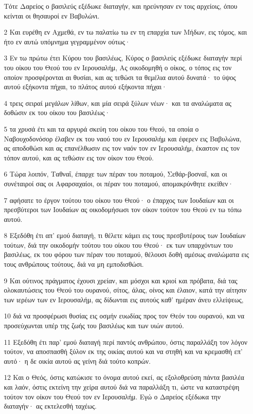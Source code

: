 \par Τότε Δαρείος ο βασιλεύς εξέδωκε διαταγήν, και ηρεύνησαν εν τοις αρχείοις, όπου κείνται οι θησαυροί εν Βαβυλώνι.
\par 2 Και ευρέθη εν Αχμεθά, εν τω παλατίω τω εν τη επαρχία των Μήδων, εις τόμος, και ήτο εν αυτώ υπόμνημα γεγραμμένον ούτως·
\par 3 Εν τω πρώτω έτει Κύρου του βασιλέως, Κύρος ο βασιλεύς εξέδωκε διαταγήν περί του οίκου του Θεού του εν Ιερουσαλήμ, Ας οικοδομηθή ο οίκος, ο τόπος εις τον οποίον προσφέρονται αι θυσίαι, και ας τεθώσι τα θεμέλια αυτού δυνατά· το ύψος αυτού εξήκοντα πήχαι, το πλάτος αυτού εξήκοντα πήχαι·
\par 4 τρεις σειραί μεγάλων λίθων, και μία σειρά ξύλων νέων· και τα αναλώματα ας δοθώσιν εκ του οίκου του βασιλέως·
\par 5 τα χρυσά έτι και τα αργυρά σκεύη του οίκου του Θεού, τα οποία ο Ναβουχοδονόσορ έλαβεν εκ του ναού του εν Ιερουσαλήμ και έφερεν εις Βαβυλώνα, ας αποδοθώσι και ας επανέλθωσιν εις τον ναόν τον εν Ιερουσαλήμ, έκαστον εις τον τόπον αυτού, και ας τεθώσιν εις τον οίκον του Θεού.
\par 6 Τώρα λοιπόν, Ταθναΐ, έπαρχε των πέραν του ποταμού, Σεθάρ-βοσναΐ, και οι συνέταιροί σας οι Αφαρσαχαίοι, οι πέραν του ποταμού, απομακρύνθητε εκείθεν·
\par 7 αφήσατε το έργον τούτου του οίκου του Θεού· ο έπαρχος των Ιουδαίων και οι πρεσβύτεροι των Ιουδαίων ας οικοδομήσωσι τον οίκον τούτον του Θεού εν τω τόπω αυτού.
\par 8 Εξεδόθη έτι απ' εμού διαταγή, τι θέλετε κάμει εις τους πρεσβυτέρους των Ιουδαίων τούτων, διά την οικοδομήν τούτου του οίκου του Θεού· εκ των υπαρχόντων του βασιλέως, εκ του φόρου των πέραν του ποταμού, θέλουσι δοθή αμέσως αναλώματα εις τους ανθρώπους τούτους, διά να μη εμποδισθώσι.
\par 9 Και ούτινος πράγματος έχουσι χρείαν, και μόσχοι και κριοί και πρόβατα, διά τας ολοκαυτώσεις του Θεού του ουρανού, σίτος, άλας, οίνος και έλαιον, κατά την αίτησιν των ιερέων των εν Ιερουσαλήμ, ας δίδωνται εις αυτούς καθ' ημέραν άνευ ελλείψεως,
\par 10 διά να προσφέρωσι θυσίας εις οσμήν ευωδίας προς τον Θεόν του ουρανού, και να προσεύχωνται υπέρ της ζωής του βασιλέως και των υιών αυτού.
\par 11 Εξεδόθη έτι παρ' εμού διαταγή περί παντός ανθρώπου, όστις παραλλάξη τον λόγον τούτον, να αποσπασθή ξύλον εκ της οικίας αυτού και να στηθή και να κρεμασθή επ' αυτό· η δε οικία αυτού ας γείνη διά τούτο κοπρών.
\par 12 Και ο Θεός, όστις κατώκισε το όνομα αυτού εκεί, ας εξολοθρεύση πάντα βασιλέα και λαόν, όστις εκτείνη την χείρα αυτού διά να παραλλάξη τι, ώστε να καταστρέψη τούτον τον οίκον του Θεού τον εν Ιερουσαλήμ. Εγώ ο Δαρείος εξέδωκα την διαταγήν· ας εκτελεσθή ταχέως.
